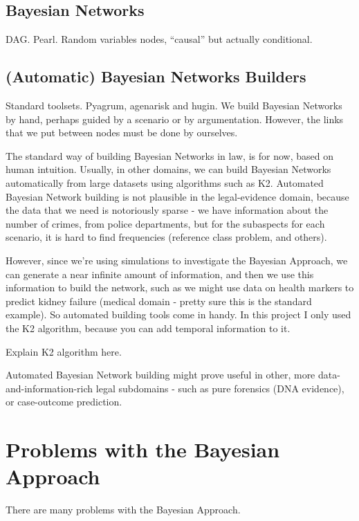 \subsection{Bayesian Networks}
DAG. Pearl. Random variables nodes, ``causal'' but actually conditional.

\subsection{(Automatic) Bayesian Networks Builders}
Standard toolsets. Pyagrum, agenarisk and hugin. We build Bayesian Networks by hand, perhaps guided by a scenario or by argumentation. However, the links that we put between nodes must be done by ourselves.

The standard way of building Bayesian Networks in law, is for now, based on human intuition. Usually, in other domains, we can build Bayesian Networks automatically from large datasets using algorithms such as K2. Automated Bayesian Network building is not plausible in the legal-evidence domain, because the data that we need is notoriously sparse - we have information about the number of crimes, from police departments, but for the subaspects for each scenario, it is hard to find frequencies (reference class problem, and others).

However, since we're using simulations to investigate the Bayesian Approach, we can generate a near infinite amount of information, and then we use this information to build the network, such as we might use data on health markers to predict kidney failure (medical domain - pretty sure this is the standard example). So automated building tools come in handy. In this project I only used the K2 algorithm, because you can add temporal information to it.

{\color{red}Explain K2 algorithm here.}

Automated Bayesian Network building might prove useful in other, more data-and-information-rich legal subdomains - such as pure forensics (DNA evidence), or case-outcome prediction.


\section{Problems with the Bayesian Approach}
There are many problems with the Bayesian Approach.

